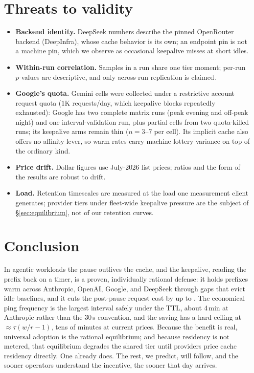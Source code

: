 \documentclass[10pt,twocolumn]{article}
\begin{document}
\section{Threats to validity}
\begin{itemize}\itemsep2pt
\item \textbf{Backend identity.} DeepSeek numbers describe the pinned
OpenRouter backend (DeepInfra), whose cache behavior is its own; an endpoint
pin is not a machine pin, which we observe as occasional keepalive misses at
short idles.
\item \textbf{Within-run correlation.} Samples in a run share one tier moment;
per-run $p$-values are descriptive, and only across-run replication is claimed.
\item \textbf{Google's quota.} Gemini cells were collected under a restrictive
account request quota (1K requests/day, which keepalive blocks repeatedly
exhausted): Google has two complete matrix runs (peak evening and off-peak
night) and one interval-validation run, plus partial cells from two
quota-killed runs; its keepalive arms remain thin ($n{=}3$--$7$ per cell). Its
implicit cache also offers no affinity lever, so warm rates carry
machine-lottery variance on top of the ordinary kind.
\item \textbf{Price drift.} Dollar figures use July-2026 list prices; ratios
and the form of the results are robust to drift.
\item \textbf{Load.} Retention timescales are measured at the load one
measurement client generates; provider tiers under fleet-wide keepalive
pressure are the subject of \S\ref{sec:equilibrium}, not of our retention
curves.
\end{itemize}

\section{Conclusion}
In agentic workloads the pause outlives the cache, and the keepalive, reading
the prefix back on a timer, is a proven, individually rational defense: it
holds prefixes warm across Anthropic, OpenAI, Google, and DeepSeek through gaps
that evict idle baselines, and it cuts the post-pause request cost by up
to \bestSavingRatio{}. The economical ping frequency is the largest interval
safely under the TTL, about 4\,min at Anthropic rather than the 30\,s
convention, and the saving has a hard ceiling at ${\approx}\tau(w/r-1)$, tens
of minutes at current prices. Because the benefit is real, universal adoption
is the rational equilibrium; and because residency is not metered, that
equilibrium degrades the shared tier until providers price cache residency
directly. One already does. The rest, we predict, will follow, and the sooner
operators understand the incentive, the sooner that day arrives.

\small


\end{document}
